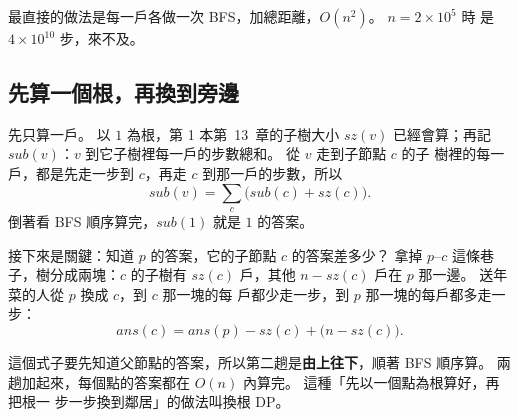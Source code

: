最直接的做法是每一戶各做一次 BFS，加總距離，$O(n^2)$。 $n = 2 \times 10^5$ 時
是 $4 \times 10^{10}$ 步，來不及。

\subsection{先算一個根，再換到旁邊}

先只算一戶。 以 $1$ 為根，第 1 本第~13~章的子樹大小 $\mathit{sz}(v)$ 已經會算；再記
$\mathit{sub}(v)$：$v$ 到它子樹裡每一戶的步數總和。 從 $v$ 走到子節點 $c$ 的子
樹裡的每一戶，都是先走一步到 $c$，再走 $c$ 到那一戶的步數，所以
\[
\mathit{sub}(v) = \sum_c \bigl(\mathit{sub}(c) + \mathit{sz}(c)\bigr).
\]
倒著看 BFS 順序算完，$\mathit{sub}(1)$ 就是 $1$ 的答案。

接下來是關鍵：知道 $p$ 的答案，它的子節點 $c$ 的答案差多少？ 拿掉
$p$--$c$ 這條巷子，樹分成兩塊：$c$ 的子樹有 $\mathit{sz}(c)$ 戶，其他 $n -
\mathit{sz}(c)$ 戶在 $p$ 那一邊。 送年菜的人從 $p$ 換成 $c$，到 $c$ 那一塊的每
戶都少走一步，到 $p$ 那一塊的每戶都多走一步：
\[
\mathit{ans}(c) = \mathit{ans}(p) - \mathit{sz}(c) + \bigl(n - \mathit{sz}(c)\bigr).
\]

\begin{center}
\label{fig:tdp-reroot}
\end{center}

這個式子要先知道父節點的答案，所以第二趟是\textbf{由上往下}，順著 BFS 順序算。
兩趟加起來，每個點的答案都在 $O(n)$ 內算完。 這種「先以一個點為根算好，再把根一
步一步換到鄰居」的做法叫換根 DP。

